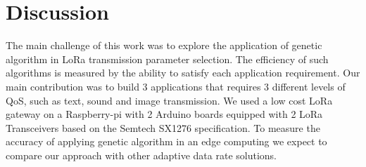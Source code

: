 \section{Discussion} \label{sec:Conclusion}

The main challenge of this work was to explore the application of genetic algorithm in LoRa transmission parameter selection.
The efficiency of such algorithms is measured by the ability to satisfy each application requirement.
Our main contribution was to build 3 applications that requires 3 different levels of QoS,
	such as text, sound and image transmission. 
We used a low cost LoRa gateway on a Raspberry-pi with 2 Arduino boards equipped with 2 LoRa Transceivers based on the Semtech SX1276 specification.
To measure the accuracy of applying genetic algorithm in an edge computing we expect to compare our approach with other adaptive data rate solutions.


